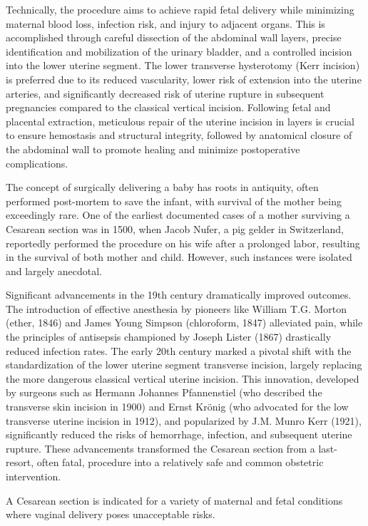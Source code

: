 Technically, the procedure aims to achieve rapid fetal delivery while minimizing maternal blood loss, infection risk, and injury to adjacent organs. This is accomplished through careful dissection of the abdominal wall layers, precise identification and mobilization of the urinary bladder, and a controlled incision into the lower uterine segment. The lower transverse hysterotomy (Kerr incision) is preferred due to its reduced vascularity, lower risk of extension into the uterine arteries, and significantly decreased risk of uterine rupture in subsequent pregnancies compared to the classical vertical incision. Following fetal and placental extraction, meticulous repair of the uterine incision in layers is crucial to ensure hemostasis and structural integrity, followed by anatomical closure of the abdominal wall to promote healing and minimize postoperative complications.

The concept of surgically delivering a baby has roots in antiquity, often performed post-mortem to save the infant, with survival of the mother being exceedingly rare. One of the earliest documented cases of a mother surviving a Cesarean section was in 1500, when Jacob Nufer, a pig gelder in Switzerland, reportedly performed the procedure on his wife after a prolonged labor, resulting in the survival of both mother and child. However, such instances were isolated and largely anecdotal.

Significant advancements in the 19th century dramatically improved outcomes. The introduction of effective anesthesia by pioneers like William T.G. Morton (ether, 1846) and James Young Simpson (chloroform, 1847) alleviated pain, while the principles of antisepsis championed by Joseph Lister (1867) drastically reduced infection rates. The early 20th century marked a pivotal shift with the standardization of the lower uterine segment transverse incision, largely replacing the more dangerous classical vertical uterine incision. This innovation, developed by surgeons such as Hermann Johannes Pfannenstiel (who described the transverse skin incision in 1900) and Ernst Kr\"onig (who advocated for the low transverse uterine incision in 1912), and popularized by J.M. Munro Kerr (1921), significantly reduced the risks of hemorrhage, infection, and subsequent uterine rupture. These advancements transformed the Cesarean section from a last-resort, often fatal, procedure into a relatively safe and common obstetric intervention.

A Cesarean section is indicated for a variety of maternal and fetal conditions where vaginal delivery poses unacceptable risks.

